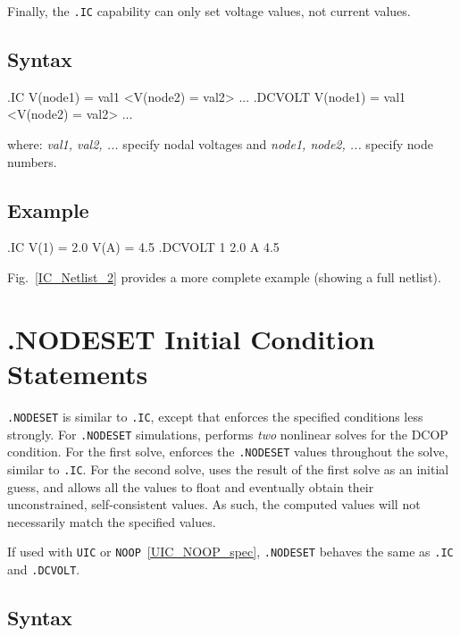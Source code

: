 Finally, the \texttt{.IC} capability can only set voltage values, not current values.

\subsection{Syntax}

\begin{vquote}
.IC V(node1) = val1 <V(node2) = val2> ...
.DCVOLT V(node1) = val1 <V(node2) = val2> ...
\end{vquote}

where:  \emph{val1, val2, ...} specify nodal voltages and \emph{node1, node2, ...} specify node numbers.

\subsection{Example}

\begin{vquote}
.IC V(1) = 2.0  V(A) = 4.5
.DCVOLT  1 2.0 A 4.5
\end{vquote}

Fig.~\ref{IC_Netlist_2} provides a more complete example (showing a full netlist).

\newpage
\section{.NODESET Initial Condition Statements}
\label{NODESET_statement_spec}


\texttt{.NODESET} is similar to \texttt{.IC}, except that \Xyce{}
enforces the specified conditions less strongly.  For
\texttt{.NODESET} simulations, \Xyce{} performs {\em two} nonlinear
solves for the DCOP condition.  For the first solve, \Xyce{} enforces
the \texttt{.NODESET} values throughout the solve, similar to
\texttt{.IC}.  For the second solve, \Xyce{} uses the result of the
first solve as an initial guess, and allows all the values to float
and eventually obtain their unconstrained, self-consistent values.  As
such, the computed values will not necessarily match the specified
values.  

If used with \texttt{UIC} or \texttt{NOOP}~\ref{UIC_NOOP_spec}, \texttt{.NODESET} 
behaves the same as \texttt{.IC} and \texttt{.DCVOLT}. 

\subsection{Syntax}

